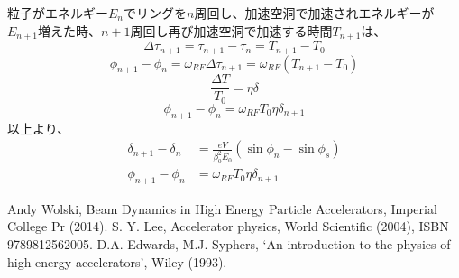 \documentclass[10pt,a4paper]{ltjsarticle}
\begin{document}
粒子がエネルギー$E_n$でリングを$n$周回し、加速空洞で加速されエネルギーが$E_{n+1}$増えた時、$n+1$周回し再び加速空洞で加速する時間$T_{n+1}$は、
%
\begin{equation}
    \Delta \tau_{n+1} = \tau_{n+1} - \tau_{n} = T_{n+1} - T_0
\end{equation}
%
\begin{equation}
    \phi_{n+1} - \phi_{n} = \omega_{RF} \Delta\tau_{n+1} = \omega_{RF} (T_{n+1}-T_0)
\end{equation}
%
\begin{equation}
    \frac{\Delta T}{T_0} = \eta\delta
\end{equation}
%
\begin{equation}
    \phi_{n+1} - \phi_{n} = \omega_{RF} T_0 \eta \delta_{n+1}
\end{equation}
%
以上より、
%
\begin{align}
    \delta_{n+1} - \delta_n &= \frac{e V}{\beta_0^2 E_0}(\sin\phi_n -\sin\phi_s) \\
    \phi_{n+1} - \phi_{n} &= \omega_{RF} T_0 \eta \delta_{n+1}
\end{align}
%
\begin{thebibliography}{9}
    Andy Wolski, Beam Dynamics in High Energy Particle Accelerators,  Imperial College Pr (2014).
    S. Y. Lee, Accelerator physics, World Scientific (2004), ISBN 9789812562005.
    D.A. Edwards, M.J. Syphers, `An introduction to the physics of high energy accelerators', Wiley (1993).
\end{thebibliography}
%
\end{document}

